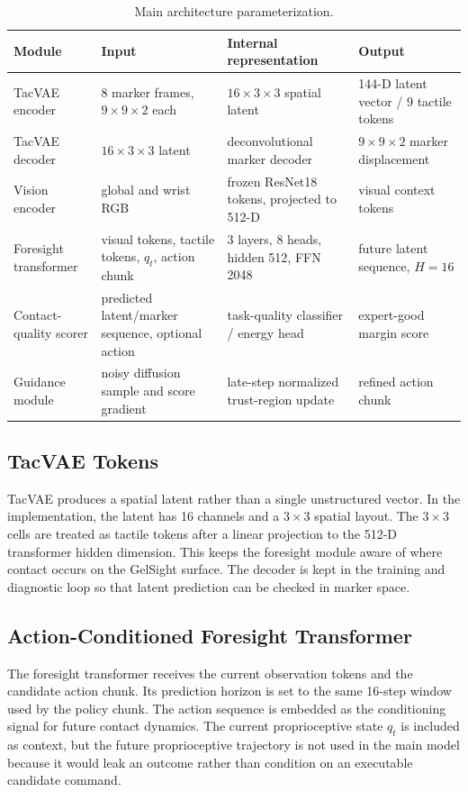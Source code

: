 \documentclass[10pt,letterpaper]{article}
\newcommand{\tabstyle}{\small\setlength{\tabcolsep}{3pt}\renewcommand{\arraystretch}{1.15}}
\begin{document}
\begin{table}[t]
\caption{Main architecture parameterization.}
\label{tab:architecture_params}
\centering
\tabstyle
\begin{tabular}{p{}p{}p{}p{}}
\toprule
Module & Input & Internal representation & Output\\
\midrule
TacVAE encoder & 8 marker frames, $9\times9\times2$ each &
$16\times3\times3$ spatial latent &
144-D latent vector / 9 tactile tokens\\
TacVAE decoder & $16\times3\times3$ latent &
deconvolutional marker decoder &
$9\times9\times2$ marker displacement\\
Vision encoder & global and wrist RGB &
frozen ResNet18 tokens, projected to 512-D &
visual context tokens\\
Foresight transformer & visual tokens, tactile tokens, $q_t$, action chunk &
3 layers, 8 heads, hidden 512, FFN 2048 &
future latent sequence, $H=16$\\
Contact-quality scorer & predicted latent/marker sequence, optional action &
task-quality classifier / energy head &
expert-good margin score\\
Guidance module & noisy diffusion sample and score gradient &
late-step normalized trust-region update &
refined action chunk\\
\bottomrule
\end{tabular}
\end{table}

\subsection{TacVAE Tokens}

TacVAE produces a spatial latent rather than a single unstructured vector. In
the implementation, the latent has 16 channels and a $3\times3$ spatial
layout. The $3\times3$ cells are treated as tactile tokens after a linear
projection to the 512-D transformer hidden dimension. This keeps the foresight
module aware of where contact occurs on the GelSight surface. The decoder is
kept in the training and diagnostic loop so that latent prediction can be
checked in marker space.

\subsection{Action-Conditioned Foresight Transformer}

The foresight transformer receives the current observation tokens and the
candidate action chunk. Its prediction horizon is set to the same 16-step
window used by the policy chunk. The action sequence is embedded as the
conditioning signal for future contact dynamics. The current proprioceptive
state $q_t$ is included as context, but the future proprioceptive trajectory is
not used in the main model because it would leak an outcome rather than
condition on an executable candidate command.
\end{document}
